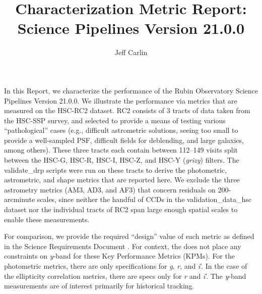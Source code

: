 \documentclass[DM,toc]{lsstdoc}
\title{Characterization Metric Report: Science Pipelines Version 21.0.0}
\date{\vcsDate}
\author{Jeff Carlin}
\begin{document}
\maketitle


In this Report, we characterize the performance of the Rubin Observatory Science Pipelines Version 21.0.0. We illustrate the performance via metrics that are measured on the HSC-RC2 dataset. RC2 consists of 3 tracts of data taken from the HSC-SSP survey, and selected to provide a means of testing various ``pathological'' cases (e.g., difficult astrometric solutions, seeing too small to provide a well-sampled PSF, difficult fields for deblending, and large galaxies, among others). These three tracts each contain between 112--149 visits split between the HSC-G, HSC-R, HSC-I, HSC-Z, and HSC-Y (\emph{grizy}) filters. The validate\_drp scripts were run on these tracts to derive the photometric, astrometric, and shape metrics that are reported here. We exclude the three astrometry metrics (AM3, AD3, and AF3) that concern residuals on 200-arcminute scales, since neither the handful of CCDs in the validation\_data\_hsc dataset nor the individual tracts of RC2 span large enough spatial scales to enable these measurements. 

For comparison, we provide the \SRD required ``design'' value of each metric as defined in the Science Requirements Document .
For context, the \SRD does not place any constraints on \emph{y}-band for these Key Performance Metrics (KPMs).  For the photometric metrics, there are only specifications for \emph{g}, \emph{r}, and \emph{i}'. In the case of the ellipticity correlation metrics, there are specs only for \emph{r} and \emph{i}'. The \emph{y}-band measurements are of interest primarily for historical tracking.
\end{document}
